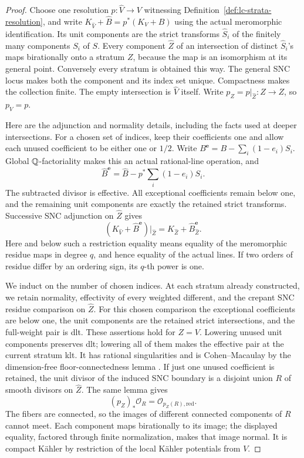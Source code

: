 \begin{proof}
Choose one resolution \(p:\widehat V\to V\) witnessing
Definition~\ref{def:lc-strata-resolution}, and write
\(K_{\widehat V}+\widehat B=p^*(K_V+B)\) using the actual meromorphic
identification.  Its unit components are the strict transforms
\(\widehat S_i\) of the finitely many components \(S_i\) of \(S\).
Every component \(\widehat Z\) of an intersection of distinct
\(\widehat S_i\)'s maps birationally onto a stratum \(Z\), because the
map is an isomorphism at its general point.  Conversely every stratum is
obtained this way.  The general SNC locus makes both the component and its
index set unique.  Compactness makes the collection finite.
The empty intersection is \(\widehat V\) itself.  Write
\(p_Z=p|_{\widehat Z}:\widehat Z\to Z\), so \(p_V=p\).

Here are the adjunction and normality details, including the facts used at
deeper intersections.  For a chosen set of indices, keep their coefficients
one and allow each unused coefficient to be either one or \(1/2\).  Write
\(B^{\mathbf e}=B-\sum_i(1-e_i)S_i\).  Global \(\mathbb Q\)-factoriality makes
this an actual rational-line operation, and
\[
 \widehat B^{\mathbf e}=\widehat B-
                  p^*\sum_i(1-e_i)S_i.
\]
The subtracted divisor is effective.  All exceptional coefficients remain
below one, and the remaining unit components are exactly the retained
strict transforms.  Successive SNC adjunction on \(\widehat Z\) gives
\[
 (K_{\widehat V}+\widehat B^{\mathbf e})|_{\widehat Z}
       =K_{\widehat Z}+\widehat B_{\widehat Z}^{\mathbf e}.
\]
Here and below such a restriction equality means equality of the
meromorphic residue maps in degree \(q\), and hence equality of the
actual lines.  If two orders of residue differ by an ordering sign, its
\(q\)-th power is one.

We induct on the number of chosen indices.  At each stratum already
constructed, we retain normality, effectivity of every weighted different,
and the crepant SNC residue comparison on \(\widehat Z\).  For this chosen
comparison the exceptional coefficients are below one, the unit components are the retained strict
intersections, and the full-weight pair is dlt.  These assertions hold for
\(Z=V\).  Lowering unused unit components preserves dlt; lowering all of
them makes the effective pair at the current stratum klt.  It has rational
singularities and is Cohen--Macaulay by the dimension-free
floor-connectedness lemma \cite[Lemma~2.1]{BL}.  If just one unused
coefficient is retained, the unit divisor of the induced SNC boundary is a
disjoint union \(R\) of smooth divisors on \(\widehat Z\).  The same lemma gives
\[
 (p_Z)_*\mathcal O_R=\mathcal O_{p_Z(R),\mathrm{red}}.
\]
The fibers are connected, so the images of different connected components
of \(R\) cannot meet.  Each component maps birationally to its image; the
displayed equality, factored through finite normalization, makes that
image normal.  It is compact K\"ahler by restriction of the local K\"ahler
potentials from \(V\).


\end{proof}

